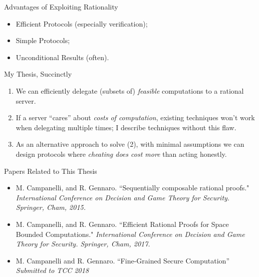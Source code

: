 \begin{frame}{Advantages of Exploiting Rationality}

	\begin{itemize}[<+- | alert@+>]
		\item Efficient Protocols (especially verification);
		\item Simple Protocols;
		\item  Unconditional Results (often).
	\end{itemize}

\end{frame}


\begin{frame}{My Thesis, Succinctly}
	\begin{enumerate}
		\item We can efficiently delegate (subsets of) \textit{feasible} computations to a rational server.\pause
		\item If a server ``cares'' about \textit{costs of computation}, existing techniques won't work when delegating multiple times; \pause I describe techniques without this flaw.\pause
		\item As an alternative approach to solve (2), with minimal assumptions we can design protocols where \textit{cheating does cost more} than acting honestly.
	\end{enumerate}
\end{frame}

\begin{frame}{Papers Related to This Thesis}
\begin{itemize}
	\item M. Campanelli, and R. Gennaro. ``Sequentially composable rational proofs." \textit{International Conference on Decision and Game Theory for Security. Springer, Cham, 2015.}
	\item M. Campanelli, and R. Gennaro. ``Efficient Rational Proofs for Space Bounded Computations." \textit{International Conference on Decision and Game Theory for Security. Springer, Cham, 2017.}
	\item M. Campanelli and R. Gennaro. ``Fine-Grained Secure Computation'' \textit{Submitted to TCC 2018}
\end{itemize}
\end{frame}


